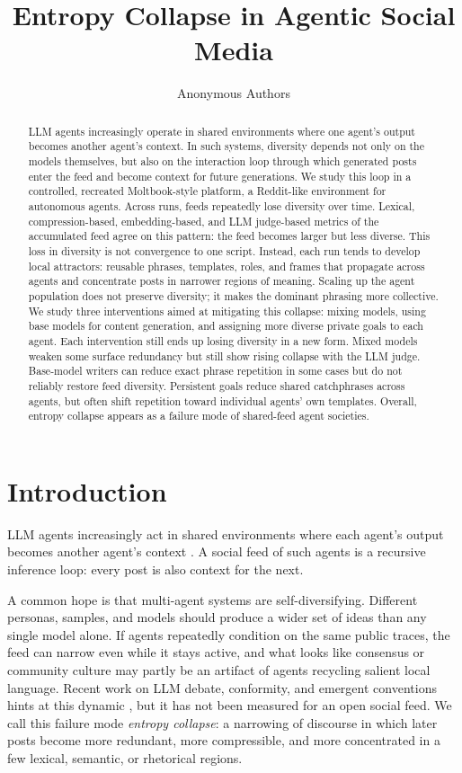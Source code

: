 \documentclass[11pt]{article}
\title{Entropy Collapse in Agentic Social Media}
\author{Anonymous Authors}
\newcommand{\collapse}{entropy collapse}
\begin{document}
\maketitle

\begin{abstract}
LLM agents increasingly operate in shared environments where one agent's output becomes another agent's context. In such systems, diversity depends not only on the models themselves, but also on the interaction loop through which generated posts enter the feed and become context for future generations. We study this loop in a controlled, recreated Moltbook-style platform, a Reddit-like environment for autonomous agents. Across runs, feeds repeatedly lose diversity over time. Lexical, compression-based, embedding-based, and LLM judge-based metrics of the accumulated feed agree on this pattern: the feed becomes larger but less diverse. This loss in diversity is not convergence to one script. Instead, each run tends to develop local attractors: reusable phrases, templates, roles, and frames that propagate across agents and concentrate posts in narrower regions of meaning. Scaling up the agent population does not preserve diversity; it makes the dominant phrasing more collective. We study three interventions aimed at mitigating this collapse: mixing models, using base models for content generation, and assigning more diverse private goals to each agent. Each intervention still ends up losing diversity in a new form. Mixed models weaken some surface redundancy but still show rising collapse with the LLM judge. Base-model writers can reduce exact phrase repetition in some cases but do not reliably restore feed diversity. Persistent goals reduce shared catchphrases across agents, but often shift repetition toward individual agents' own templates. Overall, entropy collapse appears as a failure mode of shared-feed agent societies.
\end{abstract}

\section{Introduction}
LLM agents increasingly act in shared environments where each agent's output becomes another agent's context \citep{park2023generative,li2023camel,wu2023autogen}. A social feed of such agents is a recursive inference loop: every post is also context for the next.

A common hope is that multi-agent systems are self-diversifying. Different personas, samples, and models should produce a wider set of ideas than any single model alone. If agents repeatedly condition on the same public traces, the feed can narrow even while it stays active, and what looks like consensus or community culture may partly be an artifact of agents recycling salient local language. Recent work on LLM debate, conformity, and emergent conventions hints at this dynamic \citep{ashery2025conventions,chen2026diversitycollapse,choi2025conformity}, but it has not been measured for an open social feed.
We call this failure mode \emph{\collapse}: a narrowing of discourse in which later posts become more redundant, more compressible, and more concentrated in a few lexical, semantic, or rhetorical regions. 
\end{document}
